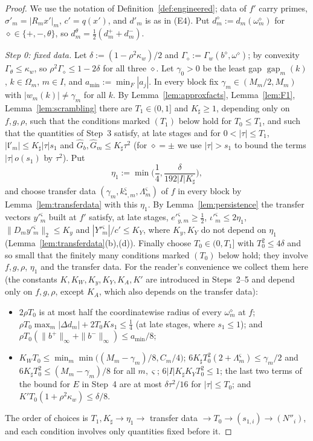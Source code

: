 \documentclass[10pt]{amsart}
\theoremstyle{definition}
\theoremstyle{remark}
\newcommand{\gap}{\operatorname{gap}}
\newcommand{\lin}{\mathfrak l}
\begin{document}
\begin{proof}
We use the notation of Definition~\ref{def:engineered}; data of $f'$ carry
primes, $\sigma'_m=|R_mx'|_m$, $c'=q(x')$, and $d'_m$ is as in (E4).  Put
$d^\diamond_m:=d_m(\omega^\diamond_m)$ for $\diamond\in\{+,-,\theta\}$, so
$d^\theta_m=\frac12(d^+_m+d^-_m)$.

\emph{Step 0: fixed data.}  Let $\delta:=(1-\rho^2\kappa_w)/2$ and
$\Gamma_\diamond:=\Gamma_w(b^\diamond,\omega^\diamond)$; by convexity
$\Gamma_\theta\le\kappa_w$, so $\rho^2\Gamma_\diamond\le1-2\delta$ for all
three $\diamond$.  Let $\gamma_0>0$ be the least gap $\gap_m(k)$, $k\in
\Omega_m$, $m\in I$, and $a_{\min}:=\min_F|a_j|$.  In every block fix
$\gamma_m\in(M_m/2,M_m)$ with $|w_m(k)|\ne\gamma_m$ for all $k$.  By
Lemma~\ref{lem:approxfacts}, Lemma~\ref{lem:F1}, Lemma~\ref{lem:scrambling}
there are $T_1\in(0,1]$ and $K_{\sharp}\ge1$, depending only on $f,g,\rho$, such
that the conditions marked $(T_1)$ below hold for $T_0\le T_1$, and such
that the quantities of Step~3 satisfy, at late stages and for
$0<|\tau|\le T_1$, $|\lin'_m|\le K_{\sharp}|\tau|s_1$ and $\hat G_b,\hat G_m\le
K_{\sharp}\tau^2$ (for $\diamond=\pm$ we use $|\tau|>s_1$ to bound the terms
$|\tau|\,o(s_1)$ by $\tau^2$).  Put
\[
 \eta_1:=\min\Big(\frac14,\frac\delta{192|I|K_{\sharp}}\Big),
\]
and choose transfer data $(\gamma_m,k^\varsigma_{*,m},\Lambda^\varsigma_m)$ of
$f$ in every block by Lemma~\ref{lem:transferdata} with this $\eta_1$.  By
Lemma~\ref{lem:persistence} the transfer vectors $y'^\varsigma_m$ built at
$f'$ satisfy, at late stages, $e'^\varsigma_{y,m}\ge\frac12$,
$\iota'^\varsigma_m\le2\eta_1$, $\|D_my'^\varsigma_m\|_2\le K_y$ and
$|Y'^\varsigma_m|/c'\le K_Y$, where $K_y,K_Y$ do not depend on $\eta_1$
(Lemma~\ref{lem:transferdata}(b),(d)).  Finally choose $T_0\in(0,T_1]$ with
$T_0^2\le4\delta$ and so small that the finitely many conditions marked
$(T_0)$ below hold; they involve $f,g,\rho$, $\eta_1$ and the transfer
data.  For the reader's convenience we collect them here (the constants
$K,K_W,K_y,K_Y,K_A,K'$ are introduced in Steps~2--5 and depend only on
$f,g,\rho$, except $K_A$, which also depends on the transfer data):
\begin{itemize}
\item[$(T_1)$] $2\rho T_0$ is at most half the coordinatewise radius of
every $\omega^\diamond_m$ at $f$; $\rho T_0\max_m|\Delta d_m|+2T_0Ks_1\le
\frac14$ \textup{(}at late stages, where $s_1\le1$\textup{)}; and
$\rho T_0(\|b^+\|_\infty+\|b^-\|_\infty)\le a_{\min}/8$;
\item[$(T_0)$] $K_WT_0\le\min_m\min\big((M_m-\gamma_m)/8,C_m/4\big)$;
$6K_{\sharp}T_0^2(2+\Lambda^\varsigma_m)\le\gamma_m/2$ and
$6K_{\sharp}T_0^2\le(M_m-\gamma_m)/8$ for all $m,\varsigma$;
$6|I|K_{\sharp}K_YT_0^2\le1$; the last two terms of the bound for $E$ in
Step~4 are at most $\delta\tau^2/16$ for $|\tau|\le T_0$; and
$K'T_0(1+\rho^2\kappa_w)\le\delta/8$.
\end{itemize}
The order of choices is $T_1,K_{\sharp}\to\eta_1\to$ transfer data
$\to T_0\to(s_{1,i})\to(N''_i)$, and each condition involves only
quantities fixed before it.


\end{proof}
\end{document}
